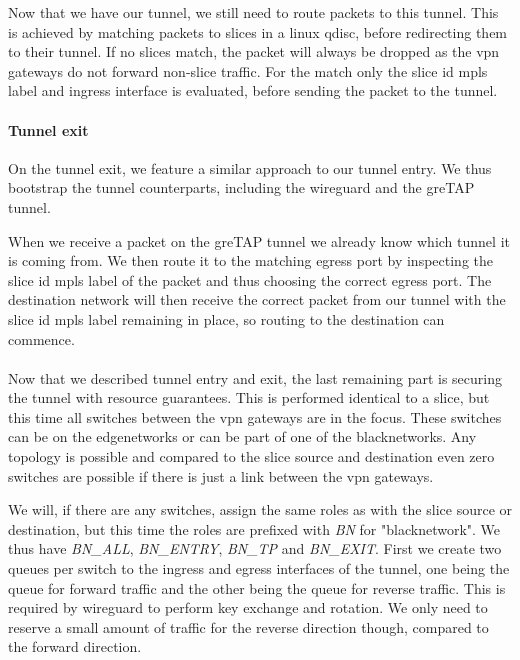 Now that we have our tunnel, we still need to route packets to this tunnel. This is achieved by matching packets to slices in a linux qdisc, before redirecting them to their tunnel. If no slices match, the packet will always be dropped as the \acrshort{vpn} gateways do not forward non-slice traffic. For the match only the slice id \acrshort{mpls} label and ingress interface is evaluated, before sending the packet to the tunnel.

\paragraph{Tunnel exit} On the tunnel exit, we feature a similar approach to our tunnel entry. We thus bootstrap the tunnel counterparts, including the \gls{wireguard} and the \acrshort{gre}TAP tunnel.

When we receive a packet on the \acrshort{gre}TAP tunnel we already know which tunnel it is coming from. We then route it to the matching egress port by inspecting the slice id \acrshort{mpls} label of the packet and thus choosing the correct egress port. The destination network will then receive the correct packet from our tunnel with the slice id \acrshort{mpls} label remaining in place, so routing to the destination can commence.

\paragraph{} Now that we described tunnel entry and exit, the last remaining part is securing the tunnel with resource guarantees. This is performed identical to a slice, but this time all switches between the \acrshort{vpn} gateways are in the focus. These switches can be on the \gls{edgenetwork}s or can be part of one of the \gls{blacknetwork}s. Any topology is possible and compared to the slice source and destination even zero switches are possible if there is just a link between the \acrshort{vpn} gateways.

We will, if there are any switches, assign the same roles as with the slice source or destination, but this time the roles are prefixed with \textit{BN} for "\gls{blacknetwork}". We thus have \textit{BN\_ALL}, \textit{BN\_ENTRY}, \textit{BN\_TP} and \textit{BN\_EXIT}. First we create two queues per switch to the ingress and egress interfaces of the tunnel, one being the queue for forward traffic and the other being the queue for reverse traffic. This is required by \gls{wireguard} to perform key exchange and rotation. We only need to reserve a small amount of traffic for the reverse direction though, compared to the forward direction.

